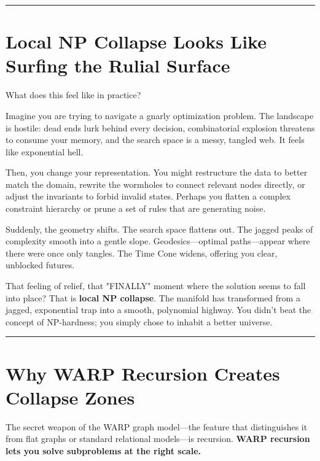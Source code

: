 \begin{center}\rule{0.5\linewidth}{0.5pt}\end{center}

\section{\texorpdfstring{\textbf{Local NP Collapse Looks Like Surfing the Rulial Surface}}{10.4 --- Local NP Collapse Looks Like Surfing the Rulial Surface}}

What does this feel like in practice?

Imagine you are trying to navigate a gnarly optimization problem. The landscape is hostile: dead ends lurk behind every decision, combinatorial explosion threatens to consume your memory, and the search space is a messy, tangled web. It feels like exponential hell.

Then, you change your representation. You might restructure the data to better match the domain, rewrite the wormholes to connect relevant nodes directly, or adjust the invariants to forbid invalid states. Perhaps you flatten a complex constraint hierarchy or prune a set of rules that are generating noise.

Suddenly, the geometry shifts. The search space flattens out. The jagged peaks of complexity smooth into a gentle slope. Geodesics—optimal paths—appear where there were once only tangles. The Time Cone widens, offering you clear, unblocked futures.

That feeling of relief, that "FINALLY" moment where the solution seems to fall into place? That is \textbf{local NP collapse}. The manifold has transformed from a jagged, exponential trap into a smooth, polynomial highway. You didn't beat the concept of NP-hardness; you simply chose to inhabit a better universe.

\begin{center}\rule{0.5\linewidth}{0.5pt}\end{center}

\section{\texorpdfstring{\textbf{Why WARP Recursion Creates Collapse Zones}}{10.5 --- Why WARP Recursion Creates Collapse Zones}}

The secret weapon of the WARP graph model—the feature that distinguishes it from flat graphs or standard relational models—is recursion. \textbf{WARP recursion lets you solve subproblems at the right scale.}

